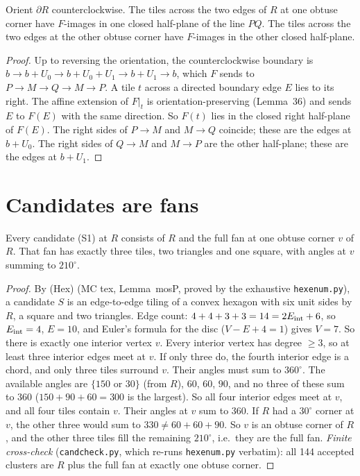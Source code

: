\documentclass[11pt]{article}
\theoremstyle{definition}\newtheorem{definition}[theorem]{Definition}\newtheorem{remark}[theorem]{Remark}
\begin{document}
\begin{lemma}\label{lem:side}
Orient $\partial R$ counterclockwise. The tiles across the two edges of $R$ at one obtuse corner have $F$-images in one closed half-plane of the line $PQ$. The tiles across the two edges at the other obtuse corner have $F$-images in the other closed half-plane.
\end{lemma}
\begin{proof}
Up to reversing the orientation, the counterclockwise boundary is $b\to b+U_0\to b+U_0+U_1\to b+U_1\to b$, which $F$ sends to $P\to M\to Q\to M\to P$. A tile $t$ across a directed boundary edge $E$ lies to its right. The affine extension of $F|_t$ is orientation-preserving (Lemma~36) and sends $E$ to $F(E)$ with the same direction. So $F(t)$ lies in the closed right half-plane of $F(E)$. The right sides of $P\to M$ and $M\to Q$ coincide; these are the edges at $b+U_0$. The right sides of $Q\to M$ and $M\to P$ are the other half-plane; these are the edges at $b+U_1$.
\end{proof}

\section{Candidates are fans}\label{sec:fan}
\begin{lemma}[candidates]\label{lem:cand}
Every candidate (S1) at $R$ consists of $R$ and the full fan at one obtuse corner $v$ of $R$. That fan has exactly three tiles, two triangles and one square, with angles at $v$ summing to $210^\circ$.
\end{lemma}
\begin{proof}
By (Hex) (MC tex, Lemma~mosP, proved by the exhaustive \texttt{hexenum.py}), a candidate $S$ is an edge-to-edge tiling of a convex hexagon with six unit sides by $R$, a square and two triangles. Edge count: $4+4+3+3=14=2E_{\rm int}+6$, so $E_{\rm int}=4$, $E=10$, and Euler's formula for the disc ($V-E+4=1$) gives $V=7$. So there is exactly one interior vertex $v$. Every interior vertex has degree $\ge3$, so at least three interior edges meet at $v$.
If only three do, the fourth interior edge is a chord, and only three tiles surround $v$. Their angles must sum to $360^\circ$. The available angles are $\{150\text{ or }30\}$ (from $R$), $60$, $60$, $90$, and no three of these sum to $360$ ($150+90+60=300$ is the largest). So all four interior edges meet at $v$, and all four tiles contain $v$.
Their angles at $v$ sum to $360$. If $R$ had a $30^\circ$ corner at $v$, the other three would sum to $330\ne60+60+90$. So $v$ is an obtuse corner of $R$, and the other three tiles fill the remaining $210^\circ$, i.e.\ they are the full fan.
\emph{Finite cross-check} (\texttt{candcheck.py}, which re-runs \texttt{hexenum.py} verbatim): all 144 accepted clusters are $R$ plus the full fan at exactly one obtuse corner.
\end{proof}
\end{document}
